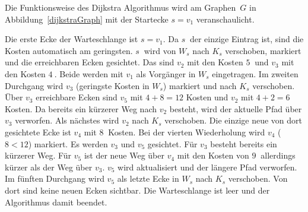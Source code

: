 Die Funktionsweise des Dijkstra Algorithmus wird am Graphen~$G$ in Abbildung~\ref{dijkstraGraph} mit der Startecke $s=v_{1}$ veranschaulicht.

Die erste Ecke der Warteschlange ist $s=v_{1}$.
Da $s~$ der einzige Eintrag ist, sind die Kosten automatisch am geringsten.
$s~$ wird von $W_{s}$ nach $K_{s}$ verschoben, markiert und die erreichbaren Ecken gesichtet.
Das sind $v_{2}$ mit den Kosten $5~$ und $v_{3}$ mit den Kosten $4~$.
Beide werden mit $v_{1}$ als Vorgänger in $W_{s}$ eingetragen.
Im zweiten Durchgang wird $v_{3}$ (geringste Kosten in $W_{s}$) markiert und nach $K_{s}$ verschoben.
Über $v_{3}$ erreichbare Ecken sind $v_{5}$ mit $4+8=12$ Kosten und $v_{2}$ mit $4+2=6$ Kosten.
Da bereits ein kürzerer Weg nach $v_{2}$ besteht, wird der aktuelle Pfad über $v_{3}$ verworfen.
Als nächstes wird $v_{2}$ nach $K_{s}$ verschoben.
Die einzige neue von dort gesichtete Ecke ist $v_{4}$ mit $8~$ Kosten.
Bei der vierten Wiederholung wird $v_{4}$ ($8<12$) markiert.
Es werden $v_{3}$ und $v_{5}$ gesichtet.
Für $v_{3}$ besteht bereits ein kürzerer Weg.
Für $v_{5}$ ist der neue Weg über $v_{4}$ mit den Kosten von $9~$ allerdings kürzer als der Weg über $v_{3}$.
$v_{5}$ wird aktualisiert und der längere Pfad verworfen.
Im fünften Durchgang wird $v_{5}$ als letzte Ecke in $W_{s}$ nach $K_{s}$ verschoben.
Von dort sind keine neuen Ecken sichtbar.
Die Warteschlange ist leer und der Algorithmus damit beendet.


